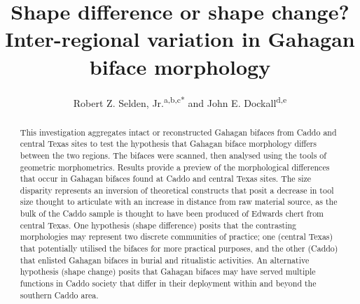 \documentclass[review]{elsarticle}
\begin{document}
\begin{frontmatter}


\title{Shape difference or shape change? Inter-regional variation in Gahagan biface morphology}



\author{Robert Z. Selden, Jr.\textsuperscript{a,b,c*} and John E. Dockall\textsuperscript{d,e}}
\address[1]{Heritage Research Center, Stephen F. Austin State University, United States}
\address[2]{Cultural Heritage Department, Jean Monnet University, France}
\address[3]{ORCID ID \href{http://orcid.org/0000-0002-1789-8449}{0000-0002-1789-8449}}
\address[4]{Prewitt and Associates, Inc., United States}
\address[5]{ORCID ID \href{http://orcid.org/0000-0002-0940-7144}{0000-0002-0940-7144}}

\begin{abstract}
This investigation aggregates intact or reconstructed Gahagan bifaces from Caddo and central Texas sites to test the hypothesis that Gahagan biface morphology differs between the two regions. The bifaces were scanned, then analysed using the tools of geometric morphometrics. Results provide a preview of the morphological differences that occur in Gahagan bifaces found at Caddo and central Texas sites. The size disparity represents an inversion of theoretical constructs that posit a decrease in tool size thought to articulate with an increase in distance from raw material source, as the bulk of the Caddo sample is thought to have been produced of Edwards chert from central Texas. One hypothesis (shape difference) posits that the contrasting morphologies may represent two discrete communities of practice; one (central Texas) that potentially utilised the bifaces for more practical purposes, and the other (Caddo) that enlisted Gahagan bifaces in burial and ritualistic activities. An alternative hypothesis (shape change) posits that Gahagan bifaces may have served multiple functions in Caddo society that differ in their deployment within and beyond the southern Caddo area.
\end{abstract}


\end{frontmatter}
\end{document}
